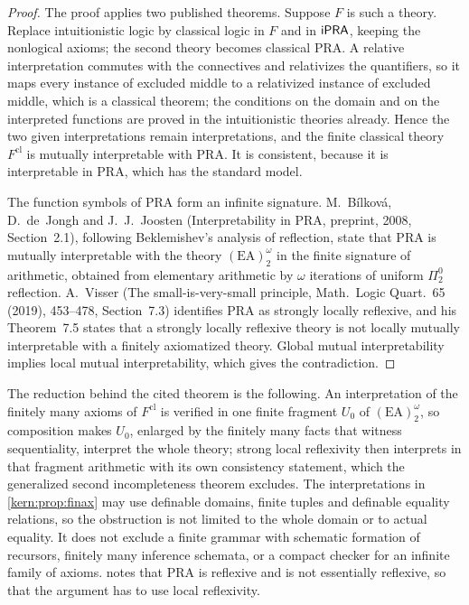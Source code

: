 \begin{proof}
The proof applies two published theorems.  Suppose $F$ is such a theory.
Replace intuitionistic logic by classical logic in $F$ and in $\mathsf{iPRA}$,
keeping the nonlogical axioms; the second theory becomes classical $\mathrm{PRA}$.
A relative interpretation commutes with the connectives and relativizes the
quantifiers, so it maps every instance of excluded middle to a relativized
instance of excluded middle, which is a classical theorem; the conditions on
the domain and on the interpreted functions are proved in the intuitionistic
theories already.  Hence the two given interpretations remain
interpretations, and the finite classical theory $F^{\mathrm{cl}}$ is
mutually interpretable with $\mathrm{PRA}$.  It is consistent, because it
is interpretable in $\mathrm{PRA}$, which has the standard model.

The function symbols of $\mathrm{PRA}$ form an infinite signature.
M.~B\'ilkov\'a, D.~de~Jongh and J.~J.~Joosten (Interpretability in PRA,
preprint, 2008, Section~2.1), following Beklemishev's analysis of reflection,
state that $\mathrm{PRA}$ is mutually interpretable with the theory
$(\mathrm{EA})^{\omega}_{2}$ in the finite signature of arithmetic, obtained
from elementary arithmetic by $\omega$ iterations of uniform
$\Pi^0_2$ reflection.  A.~Visser (The small-is-very-small principle, Math.\
Logic Quart.\ 65 (2019), 453--478, Section~7.3) identifies $\mathrm{PRA}$ as
strongly locally reflexive, and his Theorem~7.5 states that a strongly
locally reflexive theory is not locally mutually interpretable with a
finitely axiomatized theory.  Global mutual interpretability implies local
mutual interpretability, which gives the contradiction.
\end{proof}

The reduction behind the cited theorem is the following.  An
interpretation of the finitely many axioms of $F^{\mathrm{cl}}$ is verified
in one finite fragment $U_0$ of $(\mathrm{EA})^{\omega}_{2}$, so composition
makes $U_0$, enlarged by the finitely many facts that witness
sequentiality, interpret the whole theory; strong local reflexivity then
interprets in that fragment arithmetic with its own consistency statement,
which the generalized second incompleteness theorem excludes.  The
interpretations in \cref{kern:prop:finax} may use definable domains, finite
tuples and definable equality relations, so the obstruction is not limited
to the whole domain or to actual equality.  It does not exclude a finite
grammar with schematic formation of recursors, finitely many inference
schemata, or a compact checker for an infinite family of axioms.
\pkg{reductions} notes that $\mathrm{PRA}$ is reflexive and is not
essentially reflexive, so that the argument has to use local reflexivity.

